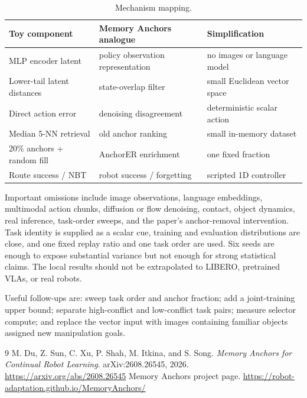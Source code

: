 \documentclass[11pt]{article}
\begin{document}
\begin{table}[H]
\centering
\small
\begin{tabular}{lll}
\toprule
Toy component & Memory Anchors analogue & Simplification \\
\midrule
MLP encoder latent & policy observation representation & no images or language model \\
Lower-tail latent distances & state-overlap filter & small Euclidean vector space \\
Direct action error & denoising disagreement & deterministic scalar action \\
Median 5-NN retrieval & old anchor ranking & small in-memory dataset \\
20\% anchors + random fill & AnchorER enrichment & one fixed fraction \\
Route success / NBT & robot success / forgetting & scripted 1D controller \\
\bottomrule
\end{tabular}
\caption{Mechanism mapping.}
\label{tab:mapping}
\end{table}

Important omissions include image observations, language embeddings, multimodal action chunks, diffusion or flow denoising, contact, object dynamics, real inference, task-order sweeps, and the paper's anchor-removal intervention. Task identity is supplied as a scalar cue, training and evaluation distributions are close, and one fixed replay ratio and one task order are used. Six seeds are enough to expose substantial variance but not enough for strong statistical claims. The local results should not be extrapolated to LIBERO, pretrained VLAs, or real robots.

Useful follow-ups are: sweep task order and anchor fraction; add a joint-training upper bound; separate high-conflict and low-conflict task pairs; measure selector compute; and replace the vector input with images containing familiar objects assigned new manipulation goals.

\begin{thebibliography}{9}
 M. Du, Z. Sun, C. Xu, P. Shah, M. Itkina, and S. Song. \emph{Memory Anchors for Continual Robot Learning}. arXiv:2608.26545, 2026. \url{https://arxiv.org/abs/2608.26545}
 Memory Anchors project page. \url{https://robot-adaptation.github.io/MemoryAnchors/}
\end{thebibliography}
\end{document}
